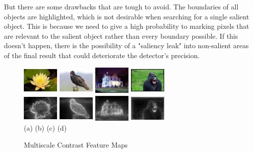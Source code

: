 \documentclass[10pt,twocolumn,letterpaper]{article}
\newcommand{\hs}{\hspace{0.58in}}
\begin{document}
But there are some drawbacks that are tough to avoid. The boundaries of all objects are highlighted, which is not desirable when searching for a single salient object.  This is because we need to give a high probability to marking pixels that are relevant to the salient object rather than every boundary possible. If this doesn't happen, there is the possibility of a "saliency leak" into non-salient areas of the final result that could deteriorate the detector's precision.


\begin{figure}[t]
    \begin{center}
    \includegraphics[width=0.7in,height=0.54in]{./Figures/contrast/1orig.jpg}
    \includegraphics[width=0.7in,height=0.54in]{./Figures/contrast/2orig.jpg}
    \includegraphics[width=0.7in,height=0.54in]{./Figures/contrast/3orig.jpg}
    \includegraphics[width=0.7in,height=0.54in]{./Figures/contrast/4orig.jpg}\\
    \includegraphics[width=0.7in,height=0.54in]{./Figures/contrast/1cont.jpg}
    \includegraphics[width=0.7in,height=0.54in]{./Figures/contrast/2cont.jpg}
    \includegraphics[width=0.7in,height=0.54in]{./Figures/contrast/3cont.jpg}
    \includegraphics[width=0.7in,height=0.54in]{./Figures/contrast/4cont.jpg}\\
    \footnotesize \hspace{0.1cm} (a) \hs (b) \hs  (c) \hs (d) \\
\caption{Multiscale Contrast Feature Maps} \label{Fig:LocalFeatureMap}
    \end{center}
\end{figure}
\end{document}

